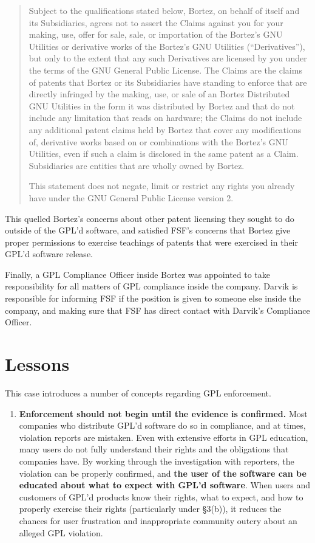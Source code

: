 {\begin{quotation}
Subject to the qualifications stated below, Bortez, on behalf of itself
and its Subsidiaries, agrees not to assert the Claims against you for your
making, use, offer for sale, sale, or importation of the Bortez's GNU
Utilities or derivative works of the Bortez's GNU Utilities
(``Derivatives''), but only to the extent that any such Derivatives are
licensed by you under the terms of the GNU General Public License. The
Claims are the claims of patents that Bortez or its Subsidiaries have
standing to enforce that are directly infringed by the making, use, or
sale of an Bortez Distributed GNU Utilities in the form it was distributed
by Bortez and that do not include any limitation that reads on hardware;
the Claims do not include any additional patent claims held by Bortez that
cover any modifications of, derivative works based on or combinations with
the Bortez's GNU Utilities, even if such a claim is disclosed in the same
patent as a Claim. Subsidiaries are entities that are wholly owned by
Bortez.

This statement does not negate, limit or restrict any rights you already
have under the GNU General Public License version 2.
\end{quotation}

This quelled Bortez's concerns about other patent licensing they sought to
do outside of the GPL'd software, and satisfied FSF's concerns that Bortez
give proper permissions to exercise teachings of patents that were
exercised in their GPL'd software release.

Finally, a GPL Compliance Officer inside Bortez was appointed to take
responsibility for all matters of GPL compliance inside the company.
Darvik is responsible for informing FSF if the position is given to
someone else inside the company, and making sure that FSF has direct
contact with Darvik's Compliance Officer.

\section{Lessons}

This case introduces a number of concepts regarding GPL enforcement.

\begin{enumerate}

\item {\bf Enforcement should not begin until the evidence is confirmed.}
  Most companies who distribute GPL'd software do so in compliance, and at
  times, violation reports are mistaken. Even with extensive efforts in
  GPL education, many users do not fully understand their rights and the
  obligations that companies have. By working through the investigation
  with reporters, the violation can be properly confirmed, and {\bf the
    user of the software can be educated about what to expect with GPL'd
    software}. When users and customers of GPL'd products know their
  rights, what to expect, and how to properly exercise their rights
  (particularly under \S 3(b)), it reduces the chances for user
  frustration and inappropriate community outcry about an alleged GPL
  violation.


\end{enumerate}}

